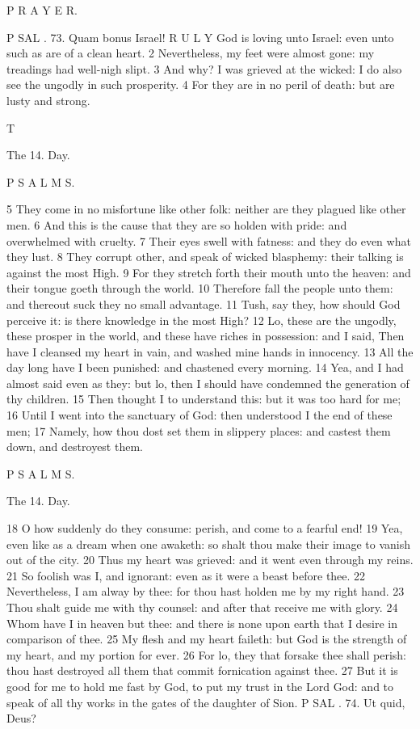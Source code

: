P R A Y E R.

P SAL . 73. Quam bonus Israel! R U L Y God is loving unto Israel: even unto such as are of a clean heart. 2 Nevertheless, my feet were almost gone: my treadings had well-nigh slipt. 3 And why? I was grieved at the wicked: I do also see the ungodly in such prosperity. 4 For they are in no peril of death: but are lusty and strong.

T

The 14. Day.

P S A L M S.

5 They come in no misfortune like other folk: neither are they plagued like other men. 6 And this is the cause that they are so holden with pride: and overwhelmed with cruelty. 7 Their eyes swell with fatness: and they do even what they lust. 8 They corrupt other, and speak of wicked blasphemy: their talking is against the most High. 9 For they stretch forth their mouth unto the heaven: and their tongue goeth through the world. 10 Therefore fall the people unto them: and thereout suck they no small advantage. 11 Tush, say they, how should God perceive it: is there knowledge in the most High? 12 Lo, these are the ungodly, these prosper in the world, and these have riches in possession: and I said, Then have I cleansed my heart in vain, and washed mine hands in innocency. 13 All the day long have I been punished: and chastened every morning. 14 Yea, and I had almost said even as they: but lo, then I should have condemned the generation of thy children. 15 Then thought I to understand this: but it was too hard for me; 16 Until I went into the sanctuary of God: then understood I the end of these men; 17 Namely, how thou dost set them in slippery places: and castest them down, and destroyest them.

P S A L M S.

The 14. Day.

18 O how suddenly do they consume: perish, and come to a fearful end! 19 Yea, even like as a dream when one awaketh: so shalt thou make their image to vanish out of the city. 20 Thus my heart was grieved: and it went even through my reins. 21 So foolish was I, and ignorant: even as it were a beast before thee. 22 Nevertheless, I am alway by thee: for thou hast holden me by my right hand. 23 Thou shalt guide me with thy counsel: and after that receive me with glory. 24 Whom have I in heaven but thee: and there is none upon earth that I desire in comparison of thee. 25 My flesh and my heart faileth: but God is the strength of my heart, and my portion for ever. 26 For lo, they that forsake thee shall perish: thou hast destroyed all them that commit fornication against thee. 27 But it is good for me to hold me fast by God, to put my trust in the Lord God: and to speak of all thy works in the gates of the daughter of Sion. P SAL . 74. Ut quid, Deus?

